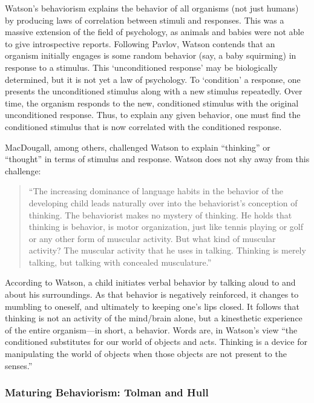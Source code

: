 \begin{refsection}
Watson’s behaviorism explains the behavior of all organisms (not just humans) by producing laws of correlation between stimuli and responses. This was a massive extension of the field of psychology, as animals and babies were not able to give introspective reports. Following Pavlov, Watson contends that an organism initially engages is some random behavior (say, a baby squirming) in response to a stimulus. This ‘unconditioned response’ may be biologically determined, but it is not yet a law of psychology. To ‘condition’ a response, one presents the unconditioned stimulus along with a new stimulus repeatedly. Over time, the organism responds to the new, conditioned stimulus with the original unconditioned response. Thus, to explain any given behavior, one must find the conditioned stimulus that is now correlated with the conditioned response.

MacDougall, among others, challenged Watson to explain “thinking” or “thought” in terms of stimulus and response. Watson does not shy away from this challenge:

\begin{quote}

“The increasing dominance of language habits in the behavior of the developing child leads naturally over into the behaviorist's conception of thinking. The behaviorist makes no mystery of thinking. He holds that thinking is behavior, is motor organization, just like tennis playing or golf or any other form of muscular activity. But what kind of muscular activity? The muscular activity that he uses in talking. Thinking is merely talking, but talking with concealed musculature.” ~\citep[p. 464]{Watson:2013ty}
\end{quote}

According to Watson, a child initiates verbal behavior by talking aloud to and about his surroundings. As that behavior is negatively reinforced, it changes to mumbling to oneself, and ultimately to keeping one's lips closed. It follows that thinking is not an activity of the mind\slash brain alone, but a kinesthetic experience of the entire organism—in short, a behavior. Words are, in Watson's view “the conditioned substitutes for our world of objects and acts. Thinking is a device for manipulating the world of objects when those objects are not present to the senses.” ~\citep{Watson:iMwU-3B8}

\subsubsection{Maturing Behaviorism: Tolman and Hull}
\label{maturingbehaviorism:tolmanandhull}


\end{refsection}
